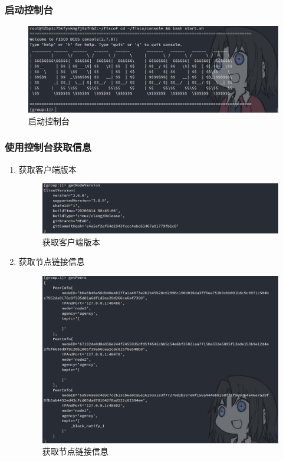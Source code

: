 \documentclass[a4paper, 11pt]{article}
\begin{document}
\subsubsection{启动控制台}
\begin{figure}[H]
      \centering
      \includegraphics[width = 0.8 \textwidth]{start_console.png}
      \caption{启动控制台}
\end{figure}

\subsubsection{使用控制台获取信息}
\begin{enumerate}
      \item 获取客户端版本
      \begin{figure}[H]
            \centering
            \includegraphics[width = 0.8 \textwidth]{version.png}
            \caption{获取客户端版本}
      \end{figure}

      \item 获取节点链接信息
      \begin{figure}[H]
            \centering
            \includegraphics[width = 0.8 \textwidth]{peers.png}
            \caption{获取节点链接信息}
      \end{figure}
\end{enumerate}
\end{document}
